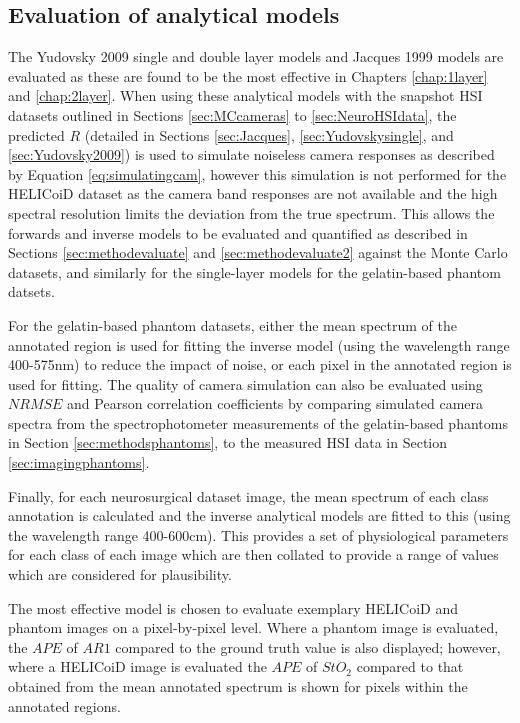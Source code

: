 \subsection{Evaluation of analytical models}
The Yudovsky 2009 single and double layer models and Jacques 1999 models are evaluated as these are found to be the most effective in Chapters \ref{chap:1layer} and \ref{chap:2layer}. When using these analytical models with the snapshot HSI datasets outlined in Sections \ref{sec:MCcameras} to \ref{sec:NeuroHSIdata}, the predicted $R$ (detailed in Sections \ref{sec:Jacques}, \ref{sec:Yudovskysingle}, and \ref{sec:Yudovsky2009}) is used to simulate noiseless camera responses as described by Equation \ref{eq:simulatingcam}, however this simulation is not performed for the HELICoiD dataset as the camera band responses are not available and the high spectral resolution limits the deviation from the true spectrum. This allows the forwards and inverse models to be evaluated and quantified as described in Sections \ref{sec:methodevaluate} and \ref{sec:methodevaluate2} against the Monte Carlo datasets, and similarly for the single-layer models for the gelatin-based phantom datsets. 

For the gelatin-based phantom datasets, either the mean spectrum of the annotated region is used for fitting the inverse model (using the wavelength range 400-575nm) to reduce the impact of noise, or each pixel in the annotated region is used for fitting. The quality of camera simulation can also be evaluated using $NRMSE$ and Pearson correlation coefficients by comparing simulated camera spectra from the spectrophotometer measurements of the gelatin-based phantoms in Section \ref{sec:methodsphantoms}, to the measured HSI data in Section \ref{sec:imagingphantoms}. 

Finally, for each neurosurgical dataset image, the mean spectrum of each class annotation is calculated and the inverse analytical models are fitted to this (using the wavelength range 400-600cm). This provides a set of physiological parameters for each class of each image which are then collated to provide a range of values which are considered for plausibility. %

The most effective model is chosen to evaluate exemplary HELICoiD and phantom images on a pixel-by-pixel level. Where a phantom image is evaluated, the $APE$ of $AR1$ compared to the ground truth value is also displayed; however, where a HELICoiD image is evaluated the $APE$ of $StO_2$ compared to that obtained from the mean annotated spectrum is shown for pixels within the annotated regions. 

